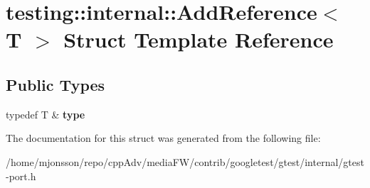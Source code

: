 \hypertarget{structtesting_1_1internal_1_1AddReference}{}\section{testing\+:\+:internal\+:\+:Add\+Reference$<$ T $>$ Struct Template Reference}
\label{structtesting_1_1internal_1_1AddReference}
\subsection*{Public Types}
\begin{DoxyCompactItemize}
\item 
\mbox{\label{structtesting_1_1internal_1_1AddReference_a2df8dd7c4e41f6390e6e66b1a9a67bb4}} 
typedef T \& {\bfseries type}
\end{DoxyCompactItemize}


The documentation for this struct was generated from the following file\+:\begin{DoxyCompactItemize}
\item 
/home/mjonsson/repo/cpp\+Adv/media\+F\+W/contrib/googletest/gtest/internal/gtest-\/port.\+h\end{DoxyCompactItemize}
